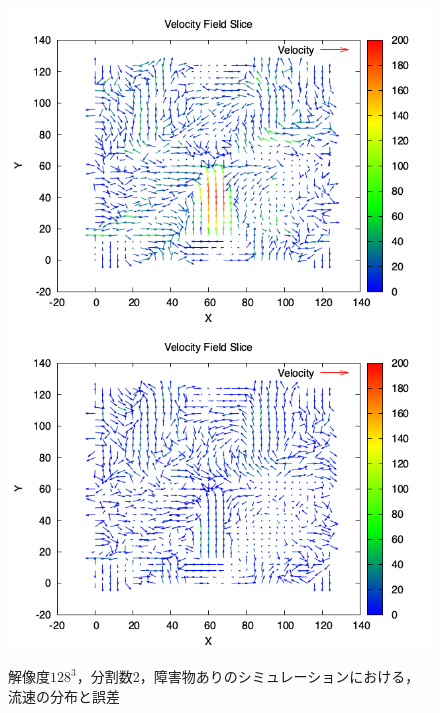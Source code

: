 \documentclass[a4j,12pt]{jreport}
\begin{document}
\begin{figure}[htbp]
\caption{$解像度128^3$，分割数2，障害物ありのシミュレーションにおける，流速の分布と誤差}
\label{fig:n128_obst_vel}
\centering
\includegraphics[width=140mm]{images/velocity_plot_100_obst.png}
\includegraphics[width=140mm]{images/velocity_plot_101_obst.png}
\end{figure}

\end{document}
